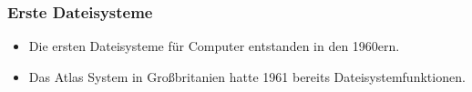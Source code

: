 \documentclass[aspectratio=169,mathserif,notheorems]{beamer}%
\begin{document}
%
\begin{frame}[t]%
\frametitle{Erste Dateisysteme}%
\begin{itemize}%
\item Die ersten Dateisysteme für Computer entstanden in den 1960ern.
\item<2-> Das Atlas System in Großbritanien hatte 1961 bereits Dateisystemfunktionen.
\end{itemize}%
%
\end{frame}
\end{document}
